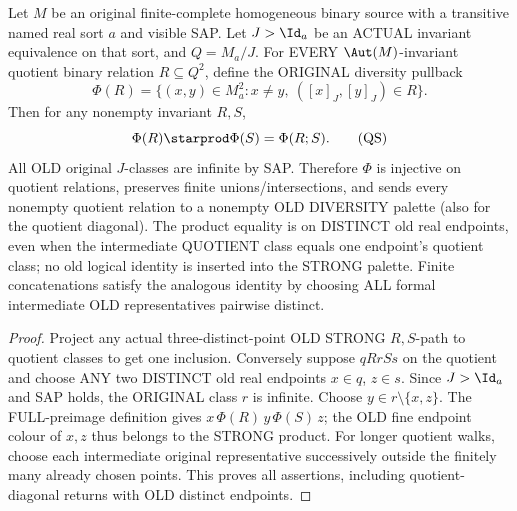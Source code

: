 \begin{lemma}
\label{lem:typed-quotient-strong-semigroup}
Let $M$ be an original finite-complete homogeneous
binary source with a transitive named real sort $a$
and visible SAP. Let $J>\Id_a$ be an ACTUAL
invariant equivalence on that sort, and
$Q=M_a/J$. For EVERY $\Aut(M)$-invariant
quotient binary relation $R\subseteq Q^2$,
define the ORIGINAL diversity pullback
\[
 \Phi(R)=\{(x,y)\in M_a^2:x\ne y,\
             ([x]_J,[y]_J)\in R\}.
\]
Then for any nonempty invariant $R,S$,
\[
                 \Phi(R)\starprod\Phi(S)
                       =\Phi(R;S).
\tag{QS}\label{eq:typed-quotient-strong-semigroup}
\]
All OLD original $J$-classes are infinite by SAP.
Therefore $\Phi$ is injective on quotient relations,
preserves finite unions/intersections, and sends
every nonempty quotient relation to a nonempty
OLD DIVERSITY palette (also for the quotient
diagonal). The product equality is on DISTINCT
old real endpoints, even when the intermediate
QUOTIENT class equals one endpoint's quotient
class; no old logical identity is inserted
into the STRONG palette. Finite concatenations
satisfy the analogous identity by choosing
ALL formal intermediate OLD representatives
pairwise distinct.
\end{lemma}
\begin{proof}
Project any actual three-distinct-point OLD
STRONG $R,S$-path to quotient classes to get
one inclusion. Conversely suppose
$qRrSs$ on the quotient and choose ANY
two DISTINCT old real endpoints $x\in q$,
$z\in s$. Since $J>\Id_a$ and SAP holds,
the ORIGINAL class $r$ is infinite.
Choose $y\in r\setminus\{x,z\}$.
The FULL-preimage definition gives
$x\,\Phi(R)\,y\,\Phi(S)\,z$;
the OLD fine endpoint colour of $x,z$
thus belongs to the STRONG product.
For longer quotient walks, choose each
intermediate original representative
successively outside the finitely many
already chosen points. This proves all
assertions, including quotient-diagonal
returns with OLD distinct endpoints.
\end{proof}

